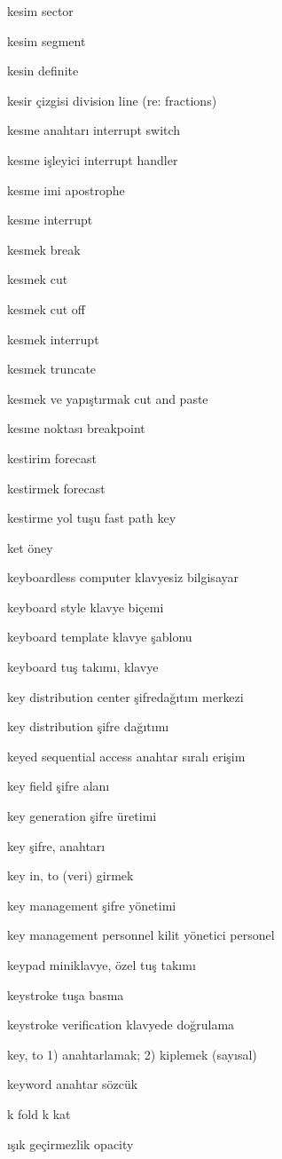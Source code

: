 \documentclass[12pt,fleqn]{article}\usepackage{../../common}
\begin{document}
kesim sector

kesim segment

kesin definite

kesir çizgisi division line (re: fractions)

kesme anahtarı interrupt switch

kesme işleyici interrupt handler

kesme imi apostrophe

kesme interrupt

kesmek break

kesmek cut

kesmek cut off

kesmek interrupt

kesmek truncate

kesmek ve yapıştırmak cut and paste

kesme noktası breakpoint

kestirim forecast

kestirmek forecast

kestirme yol tuşu fast path key

ket öney

keyboardless computer klavyesiz bilgisayar

keyboard style klavye biçemi

keyboard template klavye şablonu

keyboard tuş takımı, klavye

key distribution center şifredağıtım merkezi

key distribution şifre dağıtımı

keyed sequential access anahtar sıralı erişim

key field şifre alanı

key generation şifre üretimi

key şifre, anahtarı

key in, to (veri) girmek

key management şifre yönetimi

key management personnel kilit yönetici personel

keypad miniklavye, özel tuş takımı

keystroke tuşa basma

keystroke verification klavyede doğrulama

key, to 1) anahtarlamak; 2) kiplemek (sayısal)

keyword anahtar sözcük

k fold k kat

ışık geçirmezlik opacity
\end{document}
